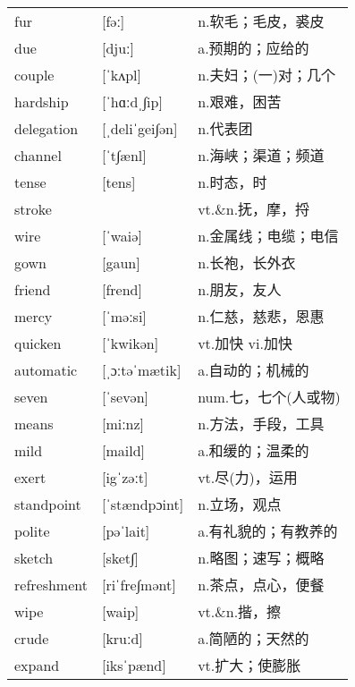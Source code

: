 \documentclass[a4paper]{article}
\begin{document}
\section{}
\begin{tabular}{l l l}

fur & [fəː] & n.软毛；毛皮，裘皮 \\
due & [djuː] & a.预期的；应给的 \\
couple & [ˈkʌpl] & n.夫妇；(一)对；几个 \\
hardship & [ˈhɑːdˌ∫ip] & n.艰难，困苦 \\
delegation & [ˌdeliˈgei∫ən] & n.代表团 \\
channel & [ˈt∫ænl] & n.海峡；渠道；频道 \\
tense & [tens] & n.时态，时 \\
stroke &  & vt.\&n.抚，摩，捋 \\
wire & [ˈwaiə] & n.金属线；电缆；电信 \\
gown & [gaun] & n.长袍，长外衣 \\
friend & [frend] & n.朋友，友人 \\
mercy & [ˈməːsi] & n.仁慈，慈悲，恩惠 \\
quicken & [ˈkwikən] & vt.加快 vi.加快 \\
automatic & [ˌɔːtəˈmætik] & a.自动的；机械的 \\
seven & [ˈsevən] & num.七，七个(人或物) \\
means & [miːnz] & n.方法，手段，工具 \\
mild & [maild] & a.和缓的；温柔的 \\
exert & [igˈzəːt] & vt.尽(力)，运用 \\
standpoint & [ˈstændpɔint] & n.立场，观点 \\
polite & [pəˈlait] & a.有礼貌的；有教养的 \\
sketch & [sket∫] & n.略图；速写；概略 \\
refreshment & [riˈfre∫mənt] & n.茶点，点心，便餐 \\
wipe & [waip] & vt.\&n.揩，擦 \\
crude & [kruːd] & a.简陋的；天然的 \\
expand & [iksˈpænd] & vt.扩大；使膨胀 \\

\end{tabular}
\end{document}

